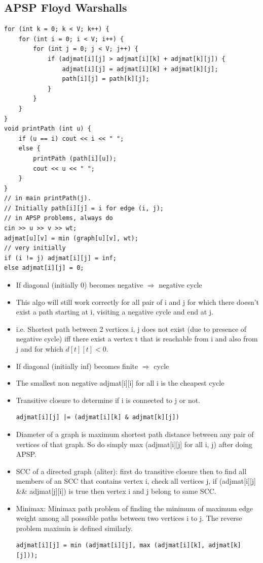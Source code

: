 \documentclass[8pt, a4paper, oneside, twocolumn]{extarticle}
\begin{document}
\subsection{APSP Floyd Warshalls}
\begin{verbatim}
for (int k = 0; k < V; k++) {
    for (int i = 0; i < V; i++) {
        for (int j = 0; j < V; j++) {
            if (adjmat[i][j] > adjmat[i][k] + adjmat[k][j]) {
                adjmat[i][j] = adjmat[i][k] + adjmat[k][j];
                path[i][j] = path[k][j];
            }
        }
    }
}
void printPath (int u) {
    if (u == i) cout << i << " ";
    else {
        printPath (path[i][u]);
        cout << u << " ";
    }
}
// in main printPath(j).
// Initially path[i][j] = i for edge (i, j);
// in APSP problems, always do 
cin >> u >> v >> wt;
adjmat[u][v] = min (graph[u][v], wt);
// very initially
if (i != j) adjmat[i][j] = inf;
else adjmat[i][j] = 0;
\end{verbatim}
\begin{itemize}
    \item If diagonal (initially 0) becomes negative $\Rightarrow$ negative cycle
    \item This algo will still work correctly for all pair of i and j for which there doesn't exist a path starting at i, visiting a negative cycle and end at j.
    \item i.e. Shortest path between 2 vertices i, j does not exist (due to presence of negative cycle) iff there exist a vertex t that is reachable from i and also from j and for which $d[t][t] < 0$.
    \item If diagonal (initially inf) becomes finite $\Rightarrow$ cycle
    \item The smallest non negative adjmat[i][i] for all i is the cheapest cycle
    \item Transitive closure to determine if i is connected to j or not.
    \begin{verbatim}
adjmat[i][j] |= (adjmat[i][k] & adjmat[k][j])
    \end{verbatim}
    \item Diameter of a graph is maximum shortest path distance between any pair of vertices of that graph. So do simply max (adjmat[i][j] for all i, j) after doing APSP.
    \item SCC of a directed graph (aliter): first do transitive closure then to find all members of an SCC that contains vertex i, check all vertices j, if (adjmat[i][j] \&\& adjmat[j][i]) is true then vertex i and j belong to same SCC.
    \item Minimax: Minimax path problem of finding the minimum of maximum edge weight among all posssible paths between two vertices i to j. The reverse problem maximin is defined similarly.
    \begin{verbatim}
adjmat[i][j] = min (adjmat[i][j], max (adjmat[i][k], adjmat[k][j]));
    \end{verbatim}
\end{itemize}
\end{document}

